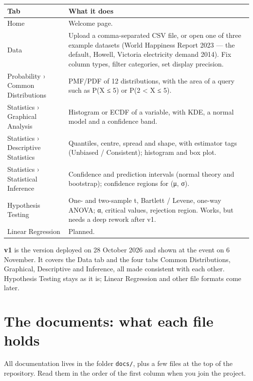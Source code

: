 \documentclass[11pt,a4paper]{article}
\newcommand{\f}[1]{\texttt{#1}}
\begin{document}
\begin{center}
\begin{tabularx}{\textwidth}{@{}lL@{}}
\toprule
\textbf{Tab} & \textbf{What it does} \\
\midrule
Home & Welcome page. \\
Data & Upload a comma-separated CSV file, or open one of three example datasets (World Happiness Report 2023 — the default, Howell, Victoria electricity demand 2014). Fix column types, filter categories, set display precision. \\
Probability › Common Distributions & PMF/PDF of 12 distributions, with the area of a query such as P(X ≤ 5) or P(2 < X ≤ 5). \\
Statistics › Graphical Analysis & Histogram or ECDF of a variable, with KDE, a normal model and a confidence band. \\
Statistics › Descriptive Statistics & Quantiles, centre, spread and shape, with estimator tags (Unbiased / Consistent); histogram and box plot. \\
Statistics › Statistical Inference & Confidence and prediction intervals (normal theory and bootstrap); confidence regions for (μ, σ). \\
Hypothesis Testing & One- and two-sample t, Bartlett / Levene, one-way ANOVA; α, critical values, rejection region. Works, but needs a deep rework after v1. \\
Linear Regression & Planned. \\
\bottomrule
\end{tabularx}
\end{center}

\textbf{v1} is the version deployed on 28 October 2026 and shown at the event on 6 November. It covers the
Data tab and the four tabs Common Distributions, Graphical, Descriptive and Inference, all made consistent with
each other. Hypothesis Testing stays as it is; Linear Regression and other file formats come later.

\section{The documents: what each file holds}

All documentation lives in the folder \f{docs/}, plus a few files at the top of the repository. Read them in
the order of the first column when you join the project.
\end{document}
